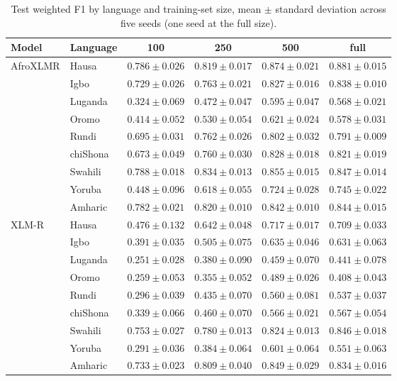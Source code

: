 \begin{table}[t]
\centering
\caption{Test weighted F1 by language and training-set size, mean $\pm$ standard deviation across five seeds (one seed at the full size).}
\label{tab:main_results}
\small
\begin{tabular}{llcccc}
\toprule
Model & Language & 100 & 250 & 500 & full \\
\midrule
AfroXLMR & Hausa & $0.786 \pm 0.026$ & $0.819 \pm 0.017$ & $0.874 \pm 0.021$ & $0.881 \pm 0.015$ \\
 & Igbo & $0.729 \pm 0.026$ & $0.763 \pm 0.021$ & $0.827 \pm 0.016$ & $0.838 \pm 0.010$ \\
 & Luganda & $0.324 \pm 0.069$ & $0.472 \pm 0.047$ & $0.595 \pm 0.047$ & $0.568 \pm 0.021$ \\
 & Oromo & $0.414 \pm 0.052$ & $0.530 \pm 0.054$ & $0.621 \pm 0.024$ & $0.578 \pm 0.031$ \\
 & Rundi & $0.695 \pm 0.031$ & $0.762 \pm 0.026$ & $0.802 \pm 0.032$ & $0.791 \pm 0.009$ \\
 & chiShona & $0.673 \pm 0.049$ & $0.760 \pm 0.030$ & $0.828 \pm 0.018$ & $0.821 \pm 0.019$ \\
 & Swahili & $0.788 \pm 0.018$ & $0.834 \pm 0.013$ & $0.855 \pm 0.015$ & $0.847 \pm 0.014$ \\
 & Yoruba & $0.448 \pm 0.096$ & $0.618 \pm 0.055$ & $0.724 \pm 0.028$ & $0.745 \pm 0.022$ \\
 & Amharic & $0.782 \pm 0.021$ & $0.820 \pm 0.010$ & $0.842 \pm 0.010$ & $0.844 \pm 0.015$ \\
\midrule
XLM-R & Hausa & $0.476 \pm 0.132$ & $0.642 \pm 0.048$ & $0.717 \pm 0.017$ & $0.709 \pm 0.033$ \\
 & Igbo & $0.391 \pm 0.035$ & $0.505 \pm 0.075$ & $0.635 \pm 0.046$ & $0.631 \pm 0.063$ \\
 & Luganda & $0.251 \pm 0.028$ & $0.380 \pm 0.090$ & $0.459 \pm 0.070$ & $0.441 \pm 0.078$ \\
 & Oromo & $0.259 \pm 0.053$ & $0.355 \pm 0.052$ & $0.489 \pm 0.026$ & $0.408 \pm 0.043$ \\
 & Rundi & $0.296 \pm 0.039$ & $0.435 \pm 0.070$ & $0.560 \pm 0.081$ & $0.537 \pm 0.037$ \\
 & chiShona & $0.339 \pm 0.066$ & $0.460 \pm 0.070$ & $0.566 \pm 0.021$ & $0.567 \pm 0.054$ \\
 & Swahili & $0.753 \pm 0.027$ & $0.780 \pm 0.013$ & $0.824 \pm 0.013$ & $0.846 \pm 0.018$ \\
 & Yoruba & $0.291 \pm 0.036$ & $0.384 \pm 0.064$ & $0.601 \pm 0.064$ & $0.551 \pm 0.063$ \\
 & Amharic & $0.733 \pm 0.023$ & $0.809 \pm 0.040$ & $0.849 \pm 0.029$ & $0.834 \pm 0.016$ \\
\bottomrule
\end{tabular}
\end{table}